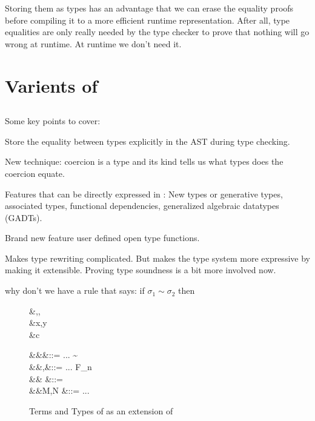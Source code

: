 \documentclass[manuscript,screen,nonacm]{acmart}
\begin{document}
Storing them as types has an advantage that we can erase the equality proofs before compiling it to a more efficient runtime representation. After all, type equalities are only really needed by the type checker to prove that nothing will go wrong at runtime. At runtime we don't need it.

\section{Varients of \SF}
\subsection{\SFC}\label{sec:sfc}
Some key points to cover:

Store the equality between types explicitly in the AST during type checking.

New technique: coercion is a type and its kind tells us what types does the coercion equate.

Features that can be directly expressed in \SFC: New types or generative types, associated types, functional dependencies, generalized algebraic datatypes (GADTs).

Brand new feature user defined open type functions.

Makes type rewriting complicated. But makes the type system more expressive by making it extensible.
Proving type soundness is a bit more involved now.

why don't we have a rule that says: if $\sigma_1 \sim \sigma_2$ then 

\begin{figure}[ht]
  \centering
  \begin{syntax}
     &\alpha,\beta,\gamma \\
     &x,y          \\
     &c 
  \end{syntax}
  \begin{syntax}
         &&\kappa       &::= ... \mid \sigma \sim \tau\\
         &&\tau,\sigma  &::= ... \mid F_n\\
     && \Co         &::= \tau \mid \sym\Co \mid \comp\nu\Co \mid \Co\At\tau \mid \left \Co \mid \right \Co \\
           &&M,N  &::= ...\mid \Cast \Tm \Co\\
  \end{syntax}
  \caption{Terms and Types of \SFC as an extension of \SF}
  \label{fig:system-fc-syntax}
\end{figure}
\end{document}
